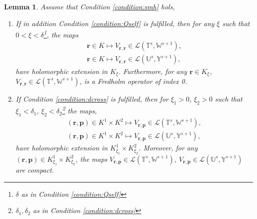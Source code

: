 \documentclass{article}
\newtheorem{lemma}[theorem]{Lemma}
\newcommand{\IU}{{\mathbb U}}
\newcommand{\IT}{{\mathbb T}}
\newcommand{\IW}{{\mathbb W}}
\newcommand{\IY}{{\mathbb Y}}
\newcommand{\bp}{{\bm p}}
\newcommand{\br}{\bm{r}}
\begin{document}
\begin{lemma}
\label{lemma:vcomp} 
Assume that Condition \ref{condition:smh} hols, 
\begin{enumerate}
\item If in addition Condition \ref{condition:Qself} is fulfilled, then for any $\xi$ such that $0<\xi < \delta$\footnote{$\delta$ as in Condition \ref{condition:Qself}}, the maps 
\begin{align*}
\br \in K \mapsto V_{\br,\br} \in 
\mathcal{L}(\IT^s, \IW^{s+1}), \\
\br \in K \mapsto V_{\br,\br} \in 
\mathcal{L}(\IU^s, \IY^{s+1}),
\end{align*}
have holomorphic extension in $K_\xi$. Furthermore, for any $\br \in K_\xi$, $V_{\br,\br} \in \mathcal{L}(\IT^s, \IW^{s+1})$, is a Fredholm operator of index 0.
\item 
If Condition \ref{condition:dcross} is fulfilled, then for $\xi_1 >0$, $\xi_2 >0$ such that $\xi_1 < \delta_1$, $\xi_2 < \delta_2$\footnote{$\delta_1,\delta_2$ as in Condition \ref{condition:dcross}} the maps,
 \begin{align*}
 (\br,\bp) \in K^1 \times K^2 \mapsto V_{\br,\bp} \in 
\mathcal{L}(\IT^s, \IW^{s+1}),\\
 (\br,\bp) \in K^1 \times K^2 \mapsto V_{\br,\bp} \in 
\mathcal{L}(\IU^s, \IY^{s+1}),
\end{align*}
have holomorphic extension in $K^1_{\xi_1} \times K^2_{\xi_2}$. Moreover, for any $(\br,\bp) \in K^1_{\xi_1} \times K^2_{\xi_2}$, the maps $V_{\br,\bp} \in \mathcal{L}(\IT^s, \IW^{s+1})$, $V_{\br,\bp} \in \mathcal{L}(\IU^s, \IY^{s+1})$ are compact. 
\end{enumerate}
\end{lemma}
\end{document}
